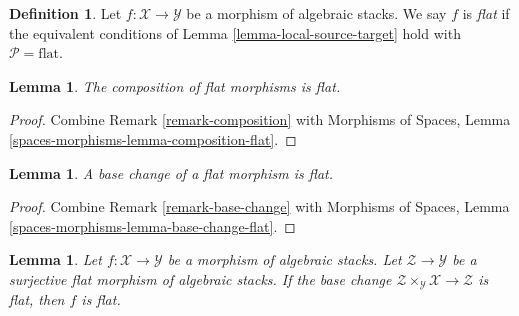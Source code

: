 \documentclass{stacks-project}
\theoremstyle{plain}
\newtheorem{lemma}[subsection]{Lemma}
\theoremstyle{definition}
\newtheorem{definition}[subsection]{Definition}
\theoremstyle{remark}
\numberwithin{equation}{subsection}
\begin{document}
\begin{definition}
\label{definition-flat}
Let $f : \mathcal{X} \to \mathcal{Y}$ be a morphism of algebraic stacks.
We say $f$ is {\it flat} if the equivalent conditions of
Lemma \ref{lemma-local-source-target}
hold with $\mathcal{P} = \text{flat}$.
\end{definition}

\begin{lemma}
\label{lemma-composition-flat}
The composition of flat morphisms is flat.
\end{lemma}

\begin{proof}
Combine
Remark \ref{remark-composition}
with
Morphisms of Spaces, Lemma
\ref{spaces-morphisms-lemma-composition-flat}.
\end{proof}

\begin{lemma}
\label{lemma-base-change-flat}
A base change of a flat morphism is flat.
\end{lemma}

\begin{proof}
Combine
Remark \ref{remark-base-change}
with
Morphisms of Spaces, Lemma
\ref{spaces-morphisms-lemma-base-change-flat}.
\end{proof}

\begin{lemma}
\label{lemma-descent-flat}
Let $f : \mathcal{X} \to \mathcal{Y}$ be a morphism of algebraic stacks.
Let $\mathcal{Z} \to \mathcal{Y}$ be a surjective flat morphism of algebraic
stacks. If the base change
$\mathcal{Z} \times_\mathcal{Y} \mathcal{X} \to \mathcal{Z}$
is flat, then $f$ is flat.
\end{lemma}
\end{document}
